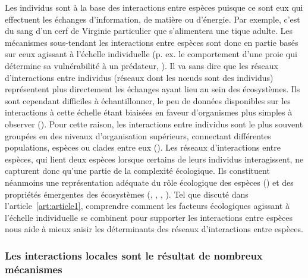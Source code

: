 Les individus sont à la base des interactions entre espèces puisque ce sont eux
qui effectuent les échanges d'information, de matière ou d'énergie. Par exemple,
c'est du sang d'un cerf de Virginie particulier que s'alimentera une tique
adulte. Les mécanismes sous-tendant les interactions entre espèces sont donc en
partie basés sur ceux agissant à l'échelle individuelle (p. ex. le comportement
d'une proie qui détermine sa vulnérabilité à un prédateur,
\cite{Choh2012Predatorprey}). Il va sans dire que les réseaux d'interactions
entre individus (réseaux dont les nœuds sont des individus) représentent plus
directement les échanges ayant lieu au sein des écosystèmes. Ils sont cependant
difficiles à échantillonner, le peu de données disponibles sur les interactions
à cette échelle étant biaisées en faveur d'organismes plus simples à observer
(\cite{Guimaraes2020Structure}). Pour cette raison, les interactions entre
individus sont le plus souvent groupées en des niveaux d'organisation
supérieurs, connectant différentes populations, espèces ou clades entre eux
(\cite{Elton1927Animal}). Les réseaux d'interactions entre espèces, qui lient
deux espèces lorsque certains de leurs individus interagissent, ne capturent
donc qu'une partie de la complexité écologique. Ils constituent néanmoins une
représentation adéquate du rôle écologique des espèces
(\cite{Delmas2019Analysing}) et des propriétés émergentes des écosystèmes
(\cite{Loreau2010Populations}, \cite{McCann2011Food},
\cite{Bascompte2013Mutualistic}, \cite{Gonzalez2020Scalingup}). Tel que discuté
dans l'article~\ref{art:article1}, comprendre comment les facteurs écologiques
agissant à l'échelle individuelle se combinent pour supporter les interactions
entre espèces nous aide à mieux saisir les déterminants des réseaux
d'interactions entre espèces.

\subsubsection{Les interactions locales sont le résultat de nombreux mécanismes} 

